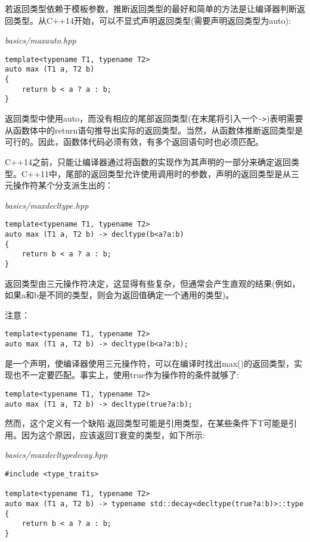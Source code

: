 
若返回类型依赖于模板参数，推断返回类型的最好和简单的方法是让编译器判断返回类型。从C++14开始，可以不显式声明返回类型(需要声明返回类型为auto):

\noindent
\textit{basics/maxauto.hpp}
\begin{lstlisting}[style=styleCXX]
template<typename T1, typename T2>
auto max (T1 a, T2 b)
{
	return b < a ? a : b;
}
\end{lstlisting}

返回类型中使用auto，而没有相应的尾部返回类型(在末尾将引入一个\texttt{->})表明需要从函数体中的return语句推导出实际的返回类型。当然，从函数体推断返回类型是可行的。因此，函数体代码必须有效，有多个返回语句时也必须匹配。

C++14之前，只能让编译器通过将函数的实现作为其声明的一部分来确定返回类型。C++11中，尾部的返回类型允许使用调用时的参数，声明的返回类型是从三元操作符某个分支派生出的：

\noindent
\textit{basics/maxdecltype.hpp}
\begin{lstlisting}[style=styleCXX]
template<typename T1, typename T2>
auto max (T1 a, T2 b) -> decltype(b<a?a:b)
{
	return b < a ? a : b;
}
\end{lstlisting}

返回类型由三元操作符决定，这显得有些复杂，但通常会产生直观的结果(例如，如果a和b是不同的类型，则会为返回值确定一个通用的类型)。

注意：

\begin{lstlisting}[style=styleCXX]
template<typename T1, typename T2>
auto max (T1 a, T2 b) -> decltype(b<a?a:b);
\end{lstlisting}

是一个声明，使编译器使用三元操作符，可以在编译时找出max()的返回类型，实现也不一定要匹配。事实上，使用true作为操作符的条件就够了:

\begin{lstlisting}[style=styleCXX]
template<typename T1, typename T2>
auto max (T1 a, T2 b) -> decltype(true?a:b);
\end{lstlisting}

然而，这个定义有一个缺陷:返回类型可能是引用类型，在某些条件下T可能是引用。因为这个原因，应该返回T衰变的类型，如下所示:

\noindent
\textit{basics/maxdecltypedecay.hpp}
\begin{lstlisting}[style=styleCXX]
#include <type_traits>

template<typename T1, typename T2>
auto max (T1 a, T2 b) -> typename std::decay<decltype(true?a:b)>::type
{
	return b < a ? a : b;
}
\end{lstlisting}

